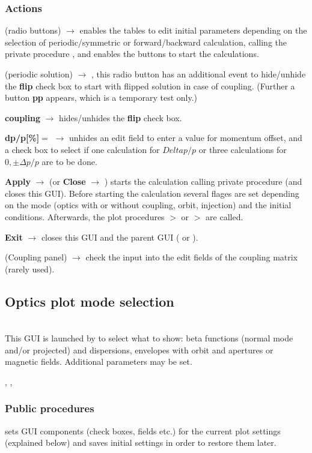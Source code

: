 \documentclass[12pt]{article}
\newcommand\code[1]{{\tt #1}}
\newcommand{\ofld}[1]{\colorbox{black!15}{{{\color{black}\bf #1}}}}
\newcommand{\ofldx}[1]{\colorbox{black!15}{{\color{black}(#1)}}}
\newcommand\guico[1]{{\color{blue}\code{#1}}}
\newcommand{\unico}[1]{{\color{burntorange}\code{#1}}}
\newcommand{\evcod}[2]{\ofld{#1} $\rightarrow$ \guico{#2}}
\newcommand{\evcodx}[2]{\ofldx{#1} $\rightarrow$ \guico{#2}}
\newcommand{\prcod}[2]{\opauni{#1}$>$\unico{#2}}
\newcommand{\opagui}[1]{\colorbox{blue!20}{{\color{black}\code{#1}}}}
\newcommand{\oguih}[2]{\subsection{\label{#2}#1}{\Huge\opagui{#2}}\\}
\newcommand{\ogui}[1]{\hyperref[#1]{\opagui{#1}}}
\newcommand{\opauni}[1]{\colorbox{orange!30}{{\color{black}\code{#1}}}}
\newcommand{\ouni}[1]{\hyperref[#1]{\opauni{#1}}}
\newcommand{\uses}[1]{\flushleft {\bf Uses:} #1}
\newcommand{\desc}[1]{#1}
\newcommand{\act}[1]{\subsubsection*{Actions} #1}
\newcommand{\ppro}[1]{\subsubsection*{Public procedures} #1}
\begin{document}
\act{
\evcodx{radio buttons}{rbutClick} enables the tables to edit initial parameters depending on the selection of periodic/symmetric or forward/backward calculation, calling the private procedure \guico{set\_pan\_ini}, and enables the buttons to start the calculations.

\evcodx{periodic solution}{rbutperChange}, this radio button has an additional event to hide/unhide the \ofld{flip} check box to start with flipped solution in case of coupling. (Further a button \ofld{pp} appears, which is a temporary test only.)

\evcod{coupling}{chk\_coupChange} hides/unhides the \ofld{flip} check box. 

\evcod{dp/p[\%]$=$}{but\_dppClick} unhides an edit field to enter a value for momentum offset, and a check box to select if one calculation for $Delta p/p$  or three calculations for $0,\pm\Delta p/p$ are to be done.

\evcod{Apply}{butapplyClick} (or \evcod{Close}{butcloClick}) starts the calculation calling private procedure \guico{Go} (and closes this GUI). Before starting the calculation several flages are set depending on the mode (optics with or without coupling, orbit, injection) and the initial conditions. Afterwards, the plot procedures \prcod{linoplib}{OpticCalc} or \prcod{linoplib}{OrbitCalc} are called.

\evcod{Exit}{butexitClick} closes this GUI and the parent GUI (\ogui{opalinop} or \ogui{opaorbit}).

\evcodx{Coupling panel}{ed\_couKeyPress,ed\_couExit} check the input into the edit fields of the coupling matrix (rarely used).
}


\oguih{Optics plot mode selection}{obetenvmag} 

\desc{This GUI is launched by \ogui{opalinop} to select what to show: beta functions (normal mode and/or projected) and dispersions, envelopes with orbit and apertures or magnetic fields. Additional parameters may be set.
}

\uses{\ouni{globlib}, \ouni{mathlib}, \ouni{../com/asaux}} 

\ppro{
\guico{Load} sets GUI components (check boxes, fields etc.) for the current plot settings (explained below) and saves initial settings in order to restore them later.
}
\end{document}
